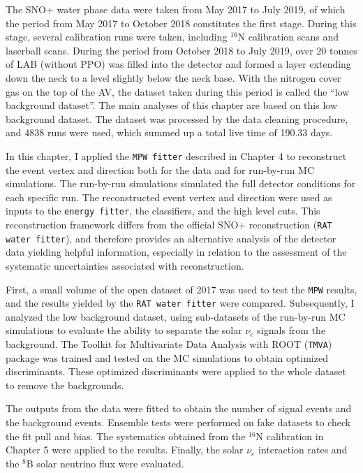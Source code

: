 
The SNO+ water phase data were taken from May 2017 to July 2019, of which the period from May 2017 to October 2018 constitutes the first stage. During this stage, several calibration runs were taken, including $^{16}$N calibration scans and laserball scans. During the period from October 2018 to July 2019, over 20 tonnes of LAB (without PPO) was filled into the detector and formed a layer extending down the neck to a level slightly below the neck base. With the nitrogen cover gas on the top of the AV, the dataset taken during this period is called the ``low background dataset''. The main analyses of this chapter are based on this low background dataset. The dataset was processed by the data cleaning procedure, and 4838 runs were used, which summed up a total live time of 190.33 days.

In this chapter, I applied the \texttt{MPW fitter} described in Chapter 4 to reconstruct the event vertex and direction both for the data and for run-by-run MC simulations. The run-by-run simulations simulated the full detector conditions for each specific run. The reconstructed event vertex and direction were used as inputs to the \texttt{energy fitter}, the classifiers, and the high level cuts. This reconstruction framework differs from the official SNO+ reconstruction (\texttt{RAT water fitter}), and therefore provides an alternative analysis of the detector data yielding helpful information, especially in relation to the assessment of the systematic uncertainties associated with reconstruction.

First, a small volume of the open dataset of 2017 was used to test the \texttt{MPW} results, and the results yielded by the \texttt{RAT water fitter} were compared. Subsequently, I analyzed the low background dataset, using sub-datasets of the run-by-run MC simulations to evaluate the ability to separate the solar $\nu_e$ signals from the background. The Toolkit for Multivariate Data Analysis with ROOT (\texttt{TMVA}) package \cite{tmvaWebsite,albertsson2007tmva} was trained and tested on the MC simulations to obtain optimized discriminants. These optimized discriminants were applied to the whole dataset to remove the backgrounds.

The outputs from the data were fitted to obtain the number of signal events and the background events. Ensemble tests were performed on fake datasets to check the fit pull and bias. The systematics obtained from the $^{16}$N calibration in Chapter 5 were applied to the results. Finally, the solar $\nu_e$ interaction rates and the $^8$B solar neutrino flux were evaluated.

